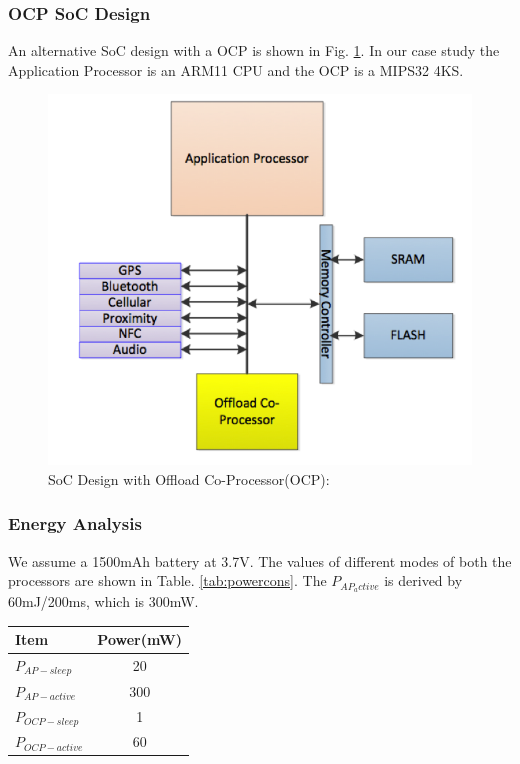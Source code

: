 \documentclass[conference]{IEEEtran}
\begin{document}
\subsubsection{OCP SoC Design}
An alternative SoC design with a OCP is shown in Fig. \ref{fig:AP}. In our case study the Application Processor is an ARM11 CPU and the OCP is a MIPS32 4KS.

\begin{figure}[htbp]
	\includegraphics[width=\linewidth]{img/Pictures/AP.png}
	\centering
    \caption{SoC Design with Offload Co-Processor(OCP): \cite{b2}}
    \label{fig:AP}
\end{figure}

\subsubsection{Energy Analysis}

We assume a 1500mAh battery at 3.7V. The values of different modes of both the processors are shown in Table. \ref{tab:powercons}. The $P_{AP_active}$ is derived by 60mJ/200ms, which is 300mW.

\begin{center}
 \label{tab:powercons}
\begin{tabular}{ |l|c| } 
\hline
\textbf{Item} & \textbf{Power(mW)} \\
\hline
$P_{AP-sleep}$ & 20\\
\hline
$P_{AP-active}$ & 300 \\
\hline
$P_{OCP-sleep}$ & 1 \\ 
\hline
$P_{OCP-active}$ & 60 \\ 
\hline
\end{tabular}
\end{center}
\end{document}
